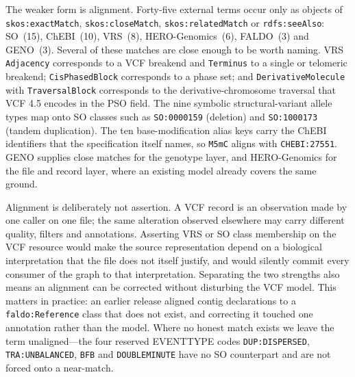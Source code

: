 \documentclass{ceurart}
\newcommand{\term}[1]{\texttt{#1}}
\begin{document}
The weaker form is alignment. Forty-five external terms occur only as objects of \term{skos:exactMatch}, \term{skos:closeMatch}, \term{skos:relatedMatch} or \term{rdfs:seeAlso}: SO~(15), ChEBI~(10), VRS~(8), HERO-Genomics~(6), FALDO~(3) and GENO~(3). Several of these matches are close enough to be worth naming. VRS \term{Adjacency} corresponds to a VCF breakend and \term{Terminus} to a single or telomeric breakend; \term{CisPhasedBlock} corresponds to a phase set; and \term{DerivativeMolecule} with \term{TraversalBlock} corresponds to the derivative-chromosome traversal that VCF 4.5 encodes in the PSO field. The nine symbolic structural-variant allele types map onto SO classes such as \term{SO:0000159} (deletion) and \term{SO:1000173} (tandem duplication). The ten base-modification alias keys carry the ChEBI identifiers that the specification itself names, so \term{M5mC} aligns with \term{CHEBI:27551}. GENO supplies close matches for the genotype layer, and HERO-Genomics for the file and record layer, where an existing model already covers the same ground.

Alignment is deliberately not assertion. A VCF record is an observation made by one caller on one file; the same alteration observed elsewhere may carry different quality, filters and annotations. Asserting VRS or SO class membership on the VCF resource would make the source representation depend on a biological interpretation that the file does not itself justify, and would silently commit every consumer of the graph to that interpretation. Separating the two strengths also means an alignment can be corrected without disturbing the VCF model. This matters in practice: an earlier release aligned contig declarations to a \term{faldo:Reference} class that does not exist, and correcting it touched one annotation rather than the model. Where no honest match exists we leave the term unaligned---the four reserved EVENTTYPE codes \term{DUP:DISPERSED}, \term{TRA:UNBALANCED}, \term{BFB} and \term{DOUBLEMINUTE} have no SO counterpart and are not forced onto a near-match.
\end{document}
